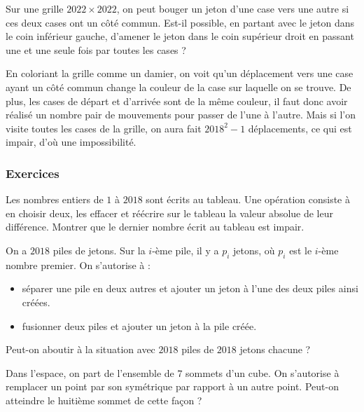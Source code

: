 \begin{exo}
Sur une grille $2022 \times 2022$, on peut bouger un jeton d'une case vers une autre si ces deux cases ont un côté commun. Est-il possible, en partant avec le jeton dans le coin inférieur gauche, d'amener le jeton dans le coin supérieur droit en passant une et une seule fois par toutes les cases ?
\end{exo}


\begin{sol}
En coloriant la grille comme un damier, on voit qu'un déplacement vers une case ayant un côté commun change la couleur de la case sur laquelle on se trouve. De plus, les cases de départ et d'arrivée sont de la même couleur, il faut donc avoir réalisé un nombre pair de mouvements pour passer de l'une à l'autre. Mais si l'on visite toutes les cases de la grille, on aura fait $2018^2-1$ déplacements, ce qui est impair, d'où une impossibilité.
\end{sol}


\subsubsection{Exercices}


\begin{exo}
Les nombres entiers de $1$ à $2018$ sont écrits au tableau. Une opération consiste à en choisir deux, les effacer et réécrire sur le tableau la valeur absolue de leur différence. Montrer que le dernier nombre écrit au tableau est impair.
\end{exo}


\begin{exo}
On a $2018$ piles de jetons. Sur la $i$-ème pile, il y a $p_i$ jetons, où $p_i$ est le $i$-ème nombre premier. On s'autorise à :
\begin{itemize}
\item séparer une pile en deux autres et ajouter un jeton à l'une des deux piles ainsi créées.
\item fusionner deux piles et ajouter un jeton à la pile créée.
\end{itemize}
Peut-on aboutir à la situation avec $2018$ piles de $2018$ jetons chacune ?
\end{exo}


\begin{exo}
Dans l'espace, on part de l'ensemble de $7$ sommets d'un cube. On s'autorise à remplacer un point par son symétrique par rapport à un autre point. Peut-on atteindre le huitième sommet de cette façon ?
\end{exo}


